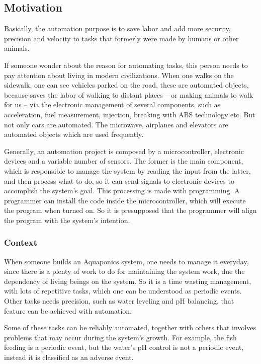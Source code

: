 \subsection{Motivation}
Basically,
the automation purpose is to save labor and add more security,
precision and velocity to tasks that formerly were made by humans or other animals.

If someone wonder about the reason for automating tasks,
this person needs to pay attention about living in modern civilizations.
When one walks on the sidewalk,
one can see vehicles parked on the road,
these are automated objects,
because saves the labor of walking to distant places --
or making animals to walk for us --
via the electronic management of several components,
such as acceleration,
fuel measurement,
injection,
breaking with ABS technology etc.
But not only cars are automated.
The microwave,
airplanes and elevators are automated objects which are used frequently.

Generally, 
an automation project is composed by a microcontroller, 
electronic devices and a variable number of sensors.
The former is the main component,
which is responsible to manage the system by reading the input from the latter,
and then process what to do,
so it can send signals to electronic devices to accomplish the system's goal.
This processing is made with programming.
A programmer can install the code inside the microcontroller,
which will execute the program when turned on.
So it is presupposed that the programmer will align the program with the system's intention.

\subsubsection{Context}
When someone builds an Aquaponics system,
one needs to manage it everyday,
since there is a plenty of work to do for maintaining the system work,
due the dependency of living beings on the system.
So it is a time wasting management,
with lots of repetitive tasks,
which one can be understood as periodic events.
Other tasks needs precision,
such as water leveling and pH balancing,
that feature can be achieved with automation.

Some of these tasks can be reliably automated,
together with others that involves problems that may occur during the system's growth.
For example, the fish feeding is a periodic event,
but the water's pH control is not a periodic event,
instead it is classified as an adverse event.

